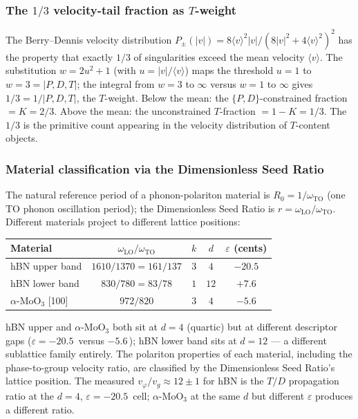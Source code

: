 \documentclass[11pt,a4paper]{article}
\theoremstyle{definition}
\theoremstyle{remark}
\begin{document}
\subsubsection*{The $1/3$ velocity-tail fraction as $T$-weight}

The Berry--Dennis velocity distribution $P_{\pm}(|v|) = 8\langle v\rangle^{2}|v|/(8|v|^{2}+4\langle v\rangle^{2})^{2}$ has the property that exactly $1/3$ of singularities exceed the mean velocity $\langle v\rangle$. The substitution $w = 2u^{2}+1$ (with $u = |v|/\langle v\rangle$) maps the threshold $u=1$ to $w=3=|{P,D,T}|$; the integral from $w=3$ to $\infty$ versus $w=1$ to $\infty$ gives $1/3 = 1/|{P,D,T}|$, the $T$-weight. Below the mean: the $\{P,D\}$-constrained fraction $= K = 2/3$. Above the mean: the unconstrained $T$-fraction $= 1-K = 1/3$. The $1/3$ is the primitive count appearing in the velocity distribution of $T$-content objects.

\subsubsection*{Material classification via the Dimensionless Seed Ratio}

The natural reference period of a phonon-polariton material is $R_{0} = 1/\omega_{\mathrm{TO}}$ (one TO phonon oscillation period); the Dimensionless Seed Ratio is $r = \omega_{\mathrm{LO}}/\omega_{\mathrm{TO}}$. Different materials project to different lattice positions:
\begin{center}
\begin{tabular}{@{}l c c c c@{}}
\toprule
Material & $\omega_{\mathrm{LO}}/\omega_{\mathrm{TO}}$ & $k$ & $d$ & $\varepsilon$ (cents)\\
\midrule
hBN upper band & $1610/1370 = 161/137$ & $3$ & $4$ & $-20.5$\\
hBN lower band & $830/780 = 83/78$ & $1$ & $12$ & $+7.6$\\
$\alpha$-MoO$_{3}$ [100] & $972/820$ & $3$ & $4$ & $-5.6$\\
\bottomrule
\end{tabular}
\end{center}
hBN upper and $\alpha$-MoO$_{3}$ both sit at $d=4$ (quartic) but at different descriptor gaps ($\varepsilon = -20.5$\,\textcent{} versus $-5.6$\,\textcent); hBN lower band sits at $d=12$ --- a different sublattice family entirely. The polariton properties of each material, including the phase-to-group velocity ratio, are classified by the Dimensionless Seed Ratio's lattice position. The measured $v_{\varphi}/v_{g} \approx 12 \pm 1$ for hBN is the $T/D$ propagation ratio at the $d=4$, $\varepsilon=-20.5$\,\textcent{} cell; $\alpha$-MoO$_{3}$ at the same $d$ but different $\varepsilon$ produces a different ratio.
\end{document}
